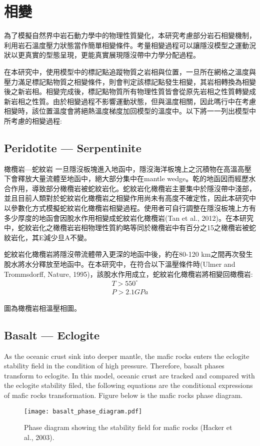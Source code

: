 \section{相變}

為了模擬自然界中岩石動力學中的物理性質變化，本研究考慮部分岩石相變機制，利用岩石溫度壓力狀態當作簡單相變條件。考量相變過程可以讓隱沒模型之運動況狀以更真實的型態呈現，更能真實展現隱沒帶中力學分配過程。

在本研究中，使用模型中的標記點追蹤物質之岩相與位置，一旦所在網格之溫度與壓力滿足標記點物質之相變條件，則會判定該標記點發生相變，其岩相轉換為相變後之新岩相。相變完成後，標記點物質所有物理性質皆會從原先岩相之性質轉變成新岩相之性質。由於相變過程不影響運動狀態，但與溫度相關，因此嗎行中在考慮相變時，該位置溫度會將絕熱溫度梯度加回模型的溫度中。以下將一一列出模型中所考慮的相變過程:

\subsection{Peridotite --- Serpentinite}
橄欖岩---蛇紋岩
一旦隱沒板塊進入地函中，隱沒海洋板塊上之沉積物在高溫高壓下會釋放大量流體至地函中，絕大部分集中在mantle wedge。乾的地函因而經歷水合作用，導致部分橄欖岩被蛇紋岩化。蛇紋岩化橄欖岩主要集中於隱沒帶中淺部，並且目前人類對於蛇紋岩化橄欖岩之相變作用尚未有高度不確定性，因此本研究中以參數化方式模擬蛇紋岩化橄欖岩相變過程。使用者可自行調整在隱沒板塊上方有多少厚度的地函會因脫水作用相變成蛇紋岩化橄欖岩(Tan et al., 2012)。在本研究中，蛇紋岩化之橄欖岩岩相物理性質約略等同於橄欖岩中有百分之15之橄欖岩被蛇紋岩化，其E減少旦A不變。
   
蛇紋岩化橄欖岩將隱沒帶流體帶入更深的地函中後，約在80-120 km之間再次發生脫水將水分釋放至地函中。在本研究中，在符合以下溫壓條件時(Ulmer and Trommsdorff, Nature, 1995)，該脫水作用成立，蛇紋岩化橄欖岩將相變回橄欖岩:
\begin{align}
T> 550 ^{\circ}\\
P > 2.1 GPa
\end{align}

圖為橄欖岩相溫壓相圖。

\subsection{Basalt --- Eclogite}

As the oceanic crust sink into deeper mantle, the mafic rocks enters the eclogite stability field in the condition of high pressure. 
Therefore, basalt phases transform to eclogite.  
In this model, oceanic crust are tracked and compared with the eclogite stability filed, the following equations are the conditional expressions of mafic rocks transformation. 
Figure below is the mafic rocks phase diagram.
\begin{figure*}[ht!]
    \centering
    \texttt{[image: basalt\_phase\_diagram.pdf]}
    \caption{ Phase diagram showing the stability field for mafic rocks (Hacker et al., 2003).  }
    \label{fig:elastic}
\end{figure*}


